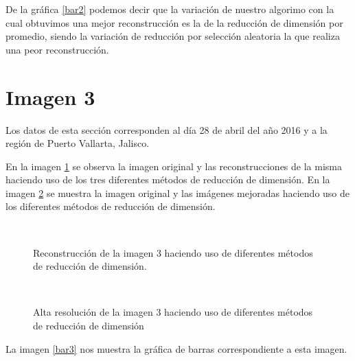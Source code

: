 De la gráfica \ref{bar2} podemos decir que la variación de nuestro algorimo con la cual obtuvimos una mejor reconstrucción es la de la reducción de dimensión por promedio, siendo la variación de reducción por selección aleatoria la que realiza una peor reconstrucción.




\section{Imagen 3}

Los datos de esta sección corresponden al día 28 de abril del año 2016 y a la región de Puerto Vallarta, Jalisco. 

En la imagen \ref{rec3} se observa la imagen original y las reconstrucciones de la misma haciendo uso de los tres diferentes métodos de reducción de dimensión. En la imagen \ref{ar3} se muestra la imagen original y las imágenes mejoradas haciendo uso de los diferentes métodos de reducción de dimensión. 

\begin{figure}[!htbp]
  \centering
  \qquad
  \qquad
  \\
  \caption{Reconstrucción de la imagen 3 haciendo uso de diferentes métodos de reducción de dimensión.}
  \label{rec3}
\end{figure}


\begin{figure}[!tbp]
  \centering
  \qquad
  \qquad
  \\
  \caption{Alta resolución de la imagen 3 haciendo uso de diferentes métodos de reducción de dimensión}
  \label{ar3}
\end{figure}

La imagen \ref{bar3} nos muestra la gráfica de barras correspondiente a esta imagen.


